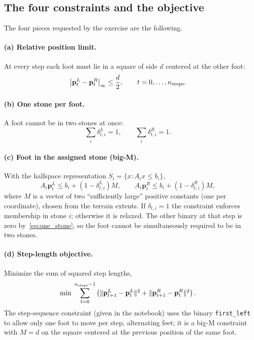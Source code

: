\documentclass[11pt]{article}
\newcommand{\bp}{\mathbf{p}}
\begin{document}
\subsection{The four constraints and the objective}

The four pieces requested by the exercise are the following.

\paragraph{(a) Relative position limit.}  At every step each foot must lie in a
square of side $d$ centered at the other foot:
\begin{equation}
\left|\bp^{L}_t-\bp^{R}_t\right|_\infty\le \frac{d}{2},
\qquad t=0,\dots,n_{\rm steps}.
\label{eq:rel_limit}
\end{equation}

\paragraph{(b) One stone per foot.}  A foot cannot be in two stones at once:
\begin{equation}
\sum_i \delta^{L}_{t,i}=1,\qquad
\sum_i \delta^{R}_{t,i}=1 .
\label{eq:one_stone}
\end{equation}

\paragraph{(c) Foot in the assigned stone (big-M).}  With the halfspace
representation $S_i=\{x:A_ix\le b_i\}$,
\begin{equation}
A_i\bp^{L}_t\le b_i+(1-\delta^{L}_{t,i})M,\qquad
A_i\bp^{R}_t\le b_i+(1-\delta^{R}_{t,i})M,
\label{eq:bigm}
\end{equation}
where $M$ is a vector of two ``sufficiently large'' positive constants (one
per coordinate), chosen from the terrain extents.  If $\delta_{t,i}=1$ the
constraint enforces membership in stone $i$; otherwise it is relaxed.  The
other binary at that step is zero by~\eqref{eq:one_stone}, so the foot cannot
be simultaneously required to be in two stones.

\paragraph{(d) Step-length objective.}  Minimize the sum of squared step
lengths,
\begin{equation}
\min\;\sum_{t=0}^{n_{\rm steps}-1}
\left(
\|\bp^{L}_{t+1}-\bp^{L}_t\|^2
+\|\bp^{R}_{t+1}-\bp^{R}_t\|^2
\right).
\label{eq:miqp_cost}
\end{equation}
The step-sequence constraint (given in the notebook) uses the binary
\texttt{first\_left} to allow only one foot to move per step, alternating feet;
it is a big-M constraint with $M=d$ on the square centered at the previous
position of the same foot.
\end{document}
